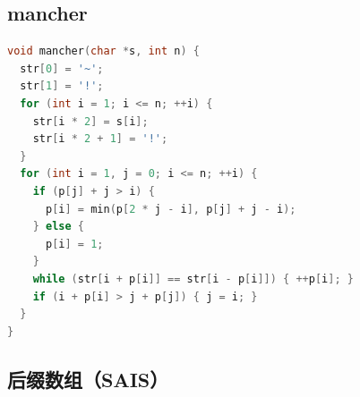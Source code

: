 \documentclass[twoside]{article}
\begin{document}
\subsection{mancher}
\begin{lstlisting}[language=c++]
void mancher(char *s, int n) {
  str[0] = '~';
  str[1] = '!';
  for (int i = 1; i <= n; ++i) {
    str[i * 2] = s[i];
    str[i * 2 + 1] = '!';
  }
  for (int i = 1, j = 0; i <= n; ++i) {
    if (p[j] + j > i) {
      p[i] = min(p[2 * j - i], p[j] + j - i);
    } else {
      p[i] = 1;
    }
    while (str[i + p[i]] == str[i - p[i]]) { ++p[i]; }
    if (i + p[i] > j + p[j]) { j = i; }
  }
}

\end{lstlisting}
\subsection{后缀数组（SAIS）}
\end{document}
